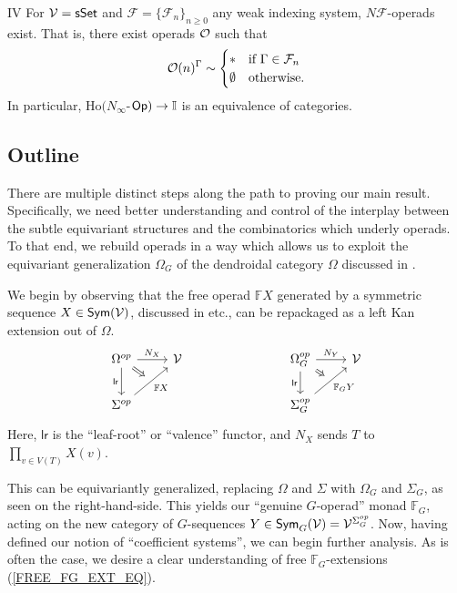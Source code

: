 \documentclass[a4paper,10pt]{article}%
\begin{document}
\begin{customcor}{IV}\label{NINFTY_REAL_COR_MAIN}
For $\mathcal V = \mathsf{sSet}$ and 
$\mathcal{F} = \{\mathcal{F}_n\}_{n \geq 0}$
any weak indexing system,
$N \mathcal{F}$-operads exist. That is, there exist operads $\mathcal{O}$
such that
\begin{equation}%
	\O(n)^{\Gamma} \sim 
\begin{cases}
	\** & \text{if } \Gamma \in \mathcal{F}_n
\\
	\emptyset & \text{otherwise}.
\end{cases}
\end{equation}  
In particular, $\mathrm{Ho}(N_\infty$-$\mathsf{Op}) \to \mathbb I$ is an equivalence of categories.%
\end{customcor}

\subsection{Outline}


There are multiple distinct steps along the path to proving our main result.  Specifically, we need better understanding and control of the interplay between the subtle equivariant structures and the combinatorics which underly operads. To that end, we rebuild operads in a way which allows us to exploit the equivariant generalization $\Omega_G$ of the dendroidal category $\Omega$ discussed in \cite{Pe17}. 

We begin by observing that the free operad $\mathbb F X$ generated by a symmetric sequence $X \in \mathsf{Sym}(\mathcal V)$, discussed in \cite{Spitz01, BM03, Rub17} etc., can be repackaged as a left Kan extension out of $\Omega$.
\[
\begin{tikzcd}
        |[alias=U]| \Omega^{op} \arrow[d, "\mathsf{lr}"'] \arrow[r, "N_X"] & \V & \qquad & |[alias=A]| \Omega_G^{op} \arrow[d, "\mathsf{lr}"'] \arrow[r, "N_Y"] & \V\\
        \Sigma^{op} \arrow[ur, "\mathbb F X"', ""{name=V}] & && \Sigma_G^{op} \arrow[ur, "\mathbb F_G Y"', ""{name=B}]
        \arrow[Rightarrow, from=U, to=V] 
        \arrow[Rightarrow, from=A, to=B]
\end{tikzcd}
\]
Here, $\mathsf{lr}$ is the ``leaf-root'' or ``valence'' functor, and $N_X$ sends $T$ to $\prod_{v\in V(T)} X(v)$.

This can be equivariantly generalized, replacing $\Omega$ and $\Sigma$ with $\Omega_G$ and $\Sigma_G$, as seen on the right-hand-side. This yields our ``genuine $G$-operad'' monad $\mathbb F_G$, acting on the new category of $G$-sequences $Y\in \mathsf{Sym}_G(\mathcal V) = \mathcal V^{\Sigma_G^{op}}$. Now, having defined our notion of ``coefficient systems'', we can begin further analysis. As is often the case, we desire a clear understanding of free $\mathbb F_G$-extensions (\ref{FREE_FG_EXT_EQ}). 
\end{document}
